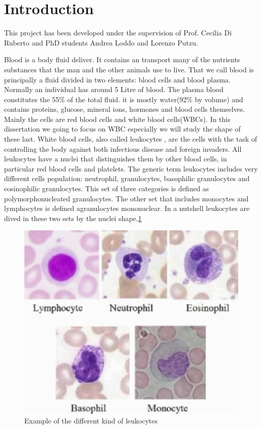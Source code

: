 
\chapter*{Introduction}
This project has been developed under the supervision of Prof. Cecilia Di Ruberto and PhD students Andrea Loddo and Lorenzo Putzu.

\bigskip


Blood is a body fluid deliver. It contains an transport many of the nutrients substances that the man and the other animals use to live. That we call blood is principally a fluid divided in two elements: blood cells and blood plasma. Normally an individual has around 5 Litre of blood. The plasma blood constitutes the 55\% of the total fluid. it is mostly water(92\% by volume) and contains proteins, glucose, mineral ions, hormones and blood cells themselves.\cite{website:wiki} Mainly the cells are red blood cells and white blood cells(WBCs). In this dissertation we going to focus on WBC especially we will study the shape of these last.
White blood cells, also called leukocytes , are the cells with the task of controlling the body against both infectious disease and foreign invaders. All leukocytes have a nuclei that distinguishes them by other blood cells, in particular red blood cells and platelets. The generic term leukocytes includes very different cells population: neutrophil, granulocytes, basophilic granulocytes and eosinophilic granulocytes. This set of three categories is defined as   polymorphonucleated granulocytes. The other set that includes monocytes and lymphocytes is defined agranulocytes mononuclear. In a nutshell leukocytes are dived in these two sets by the nuclei shape.\ref{fig:kindLeuko}
\begin{figure}
	\begin{center}
		\centering
		\includegraphics[scale=0.5]{img/leuko.png}
		\caption{Example of the different kind of leukocytes\cite{ann17}}
		\label{fig:kindLeuko}
	\end{center}
\end{figure}

